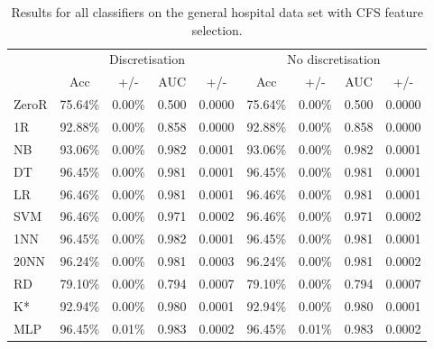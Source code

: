 \begin{table}[htbp]
\caption{Results for all classifiers on the general hospital data set with CFS feature selection.}
\begin{tabular}{|l|cccc|cccc|}
\hline
 & \multicolumn{ 4}{c|}{Discretisation} & \multicolumn{ 4}{c|}{No discretisation} \\ 
 & Acc & +/- & AUC & +/- & Acc & +/- & AUC & +/- \\ \hline
  ZeroR & 75.64\% & 0.00\% & 0.500 & 0.0000 & 75.64\% & 0.00\% & 0.500 & 0.0000 \\ 
  1R & 92.88\% & 0.00\% & 0.858 & 0.0000 & 92.88\% & 0.00\% & 0.858 & 0.0000 \\ 
  NB & 93.06\% & 0.00\% & 0.982 & 0.0001 & 93.06\% & 0.00\% & 0.982 & 0.0001 \\ 
  DT & 96.45\% & 0.00\% & 0.981 & 0.0001 & 96.45\% & 0.00\% & 0.981 & 0.0001 \\ 
  LR & 96.46\% & 0.00\% & 0.981 & 0.0001 & 96.46\% & 0.00\% & 0.981 & 0.0001 \\ 
  SVM & 96.46\% & 0.00\% & 0.971 & 0.0002 & 96.46\% & 0.00\% & 0.971 & 0.0002 \\ 
  1NN & 96.45\% & 0.00\% & 0.982 & 0.0001 & 96.45\% & 0.00\% & 0.981 & 0.0001 \\ 
  20NN & 96.24\% & 0.00\% & 0.981 & 0.0003 & 96.24\% & 0.00\% & 0.981 & 0.0002 \\ 
  RD & 79.10\% & 0.00\% & 0.794 & 0.0007 & 79.10\% & 0.00\% & 0.794 & 0.0007 \\ 
  K* & 92.94\% & 0.00\% & 0.980 & 0.0001 & 92.94\% & 0.00\% & 0.980 & 0.0001 \\ 
  MLP & 96.45\% & 0.01\% & 0.983 & 0.0002 & 96.45\% & 0.01\% & 0.983 & 0.0002 \\ \hline
\end{tabular}
\end{table}
